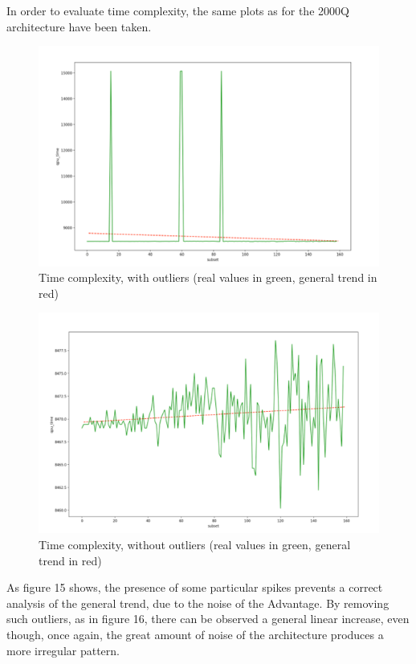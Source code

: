 \documentclass[oneside,a4paper]{article}
\begin{document}
In order to evaluate time complexity, the same plots as for the 2000Q architecture have been taken.

\begin{figure}[htp]
\centering
\includegraphics[width=15cm]{LaTeXTemplate/Images/AdvantagefirstT2.png}
\caption{Time complexity, with outliers (real values in green, general trend in red)}
\end{figure}
\begin{figure}[htp]
\centering
\includegraphics[width=15cm]{LaTeXTemplate/Images/AdvantagefirstT1.png}
\caption{Time complexity, without outliers (real values in green, general trend in red)}
\end{figure}

As figure 15 shows, the presence of some particular spikes prevents a correct analysis of the general trend, due to the noise of the Advantage. By removing such outliers, as in figure 16, 
there can be observed a general linear increase, even though, once again, the great amount of noise of the architecture produces a more irregular pattern.
\newpage
\end{document}
